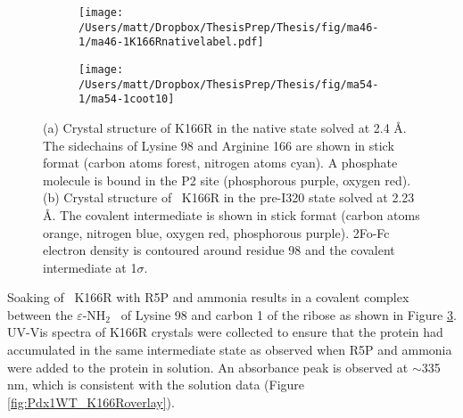 \begin{figure}
\centering
\begin{subfigure}{.49\textwidth}
  \centering
  \texttt{[image: /Users/matt/Dropbox/ThesisPrep/Thesis/fig/ma46-1/ma46-1K166Rnativelabel.pdf]}	
	 
    \caption{\label{fig:K166R_Native} }
 
\end{subfigure}
\begin{subfigure}{.49\textwidth}
  \centering
  \texttt{[image: /Users/matt/Dropbox/ThesisPrep/Thesis/fig/ma54-1/ma54-1coot10]}
 
  \caption{\label{fig:K166R_320}}
 
\end{subfigure}

\caption[Crystal structures of \atpdx ~K166R in the native and pre-I320 States]{(a) Crystal structure of \atpdx K166R in the native state solved at 2.4 \si{\angstrom}. The sidechains of Lysine 98 and Arginine 166 are shown in stick format (carbon atoms forest, nitrogen atoms cyan). A phosphate molecule is bound in the P2 site (phosphorous purple, oxygen red). (b) Crystal structure of \atpdx ~K166R in the pre-I320 state solved at 2.23 \si{\angstrom}. The covalent intermediate is shown in stick format (carbon atoms orange, nitrogen blue, oxygen red, phosphorous purple). 2Fo-Fc electron density is contoured around residue 98 and the covalent intermediate at 1$\sigma$.}
\end{figure}

\par

Soaking of \atpdx ~K166R with R5P and ammonia results in a covalent complex between the $\varepsilon$-NH$_2$ ~of Lysine 98 and carbon 1 of the ribose as shown in Figure \ref{fig:K166R_320}. UV-Vis spectra of \atpdx K166R crystals were collected to ensure that the protein had accumulated in the same intermediate state as observed when R5P and ammonia were added to the protein in solution. An absorbance peak is observed at $\sim$335 nm, which is consistent with the solution data (Figure \ref{fig:Pdx1WT_K166Roverlay}). 
\par

